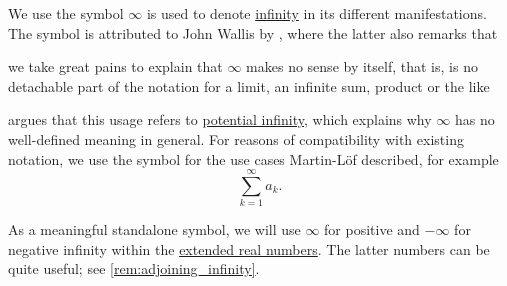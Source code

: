 \begin{remark}\label{rem:lemniscate_symbol}
  We use the  symbol \( \infty \) is used to denote \hyperref[con:transfinitum]{infinity} in its different manifestations. The symbol is attributed to John Wallis by , where the latter also remarks that
  \begin{displayquote}
    \textellipsis we take great pains to explain that \( \infty \) makes no sense by itself, that is, is no detachable part of the notation for a limit, an infinite sum, product or the like \textellipsis
  \end{displayquote}

   argues that this usage refers to \hyperref[con:transfinitum]{potential infinity}, which explains why \( \infty \) has no well-defined meaning in general. For reasons of compatibility with existing notation, we use the symbol for the use cases Martin-L\"of described, for example
  \begin{equation*}
    \sum_{k=1}^\infty a_k.
  \end{equation*}

  As a meaningful standalone symbol, we will use \( \infty \) for positive and \( -\infty \) for negative infinity within the \hyperref[def:extended_real_numbers]{extended real numbers}. The latter numbers can be quite useful; see \cref{rem:adjoining_infinity}.
\end{remark}

